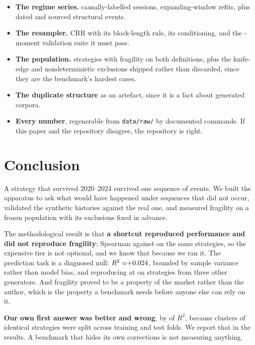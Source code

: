 \documentclass[11pt,a4paper]{article}
\begin{document}
\begin{itemize}
\item \textbf{The regime series.} \rsNLabelledSessions{} causally-labelled sessions,
  \rsNRegimeRefits{} expanding-window refits, plus \rsNSebiEvents{} dated and sourced structural
  events.
\item \textbf{The resampler.} CRR with its block-length rule, its conditioning, and the
  \rsNMoments{}-moment validation suite it must pass.
\item \textbf{The population.} \rsNPrimary{} strategies with fragility on both definitions, plus
  the \rsNKnifeEdge{} knife-edge and \rsNExcludedNondeterministic{} nondeterministic exclusions
  shipped rather than discarded, since they are the benchmark's hardest cases.
\item \textbf{The duplicate structure} as an artefact, since it is a fact about generated corpora.
\item \textbf{Every number}, regenerable from \texttt{data/raw/} by documented commands. If this
  paper and the repository disagree, the repository is right.
\end{itemize}

\section{Conclusion}

A strategy that survived 2020--2024 survived one sequence of events. We built the apparatus to ask
what would have happened under sequences that did not occur, validated the synthetic histories
against the real one, and measured fragility on a frozen population with its exclusions fixed in
advance.

The methodological result is that \textbf{a shortcut reproduced performance and did not reproduce
fragility}: Spearman \rsTierAgreementMeanSharpe{} against \rsTierAgreementFragility{} on the
same \rsTierAgreementN{} strategies, so the expensive tier is not optional, and we know that
because we ran it. The prediction task is a diagnosed null: $R^2=\rsPathsRawBestRsquared{}$, bounded
by sample variance rather than model bias, and reproducing at \rsGvPredPooledRsq{} on strategies
from three other generators. And fragility proved to be a property of the market rather than the
author, which is the property a benchmark needs before anyone else can rely on it.

\begin{finding}
\textbf{Our own first answer was better and wrong}, by \rsLeakageDelta{} of $R^2$, because
\rsDuplicateClusters{} clusters of identical strategies were split across training and test folds.
We report that in the results. A benchmark that hides its own corrections is not measuring
anything.
\end{finding}
\end{document}
